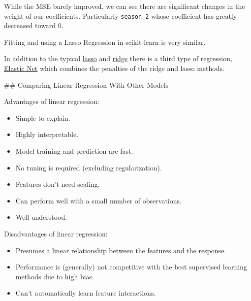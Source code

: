 \documentclass[11pt]{article}
\providecommand{\tightlist}{%
      \setlength{\itemsep}{0pt}\setlength{\parskip}{0pt}}
\begin{document}
    While the MSE barely improved, we can see there are significant changes
in the weight of our coefficients. Particularly \texttt{season\_2} whose
coefficient has greatly decreased toward 0.

Fitting and using a Lasso Regression in scikit-learn is very similar.

In addition to the typical
\href{http://scikit-learn.org/stable/modules/generated/sklearn.linear_model.Lasso.html}{lasso}
and
\href{http://scikit-learn.org/stable/modules/generated/sklearn.linear_model.Ridge.html}{ridge}
there is a third type of regression,
\href{http://scikit-learn.org/stable/modules/generated/sklearn.linear_model.ElasticNet.html}{Elastic
Net} which combines the penalties of the ridge and lasso methods.

     \#\# Comparing Linear Regression With Other Models

Advantages of linear regression:

\begin{itemize}
\tightlist
\item
  Simple to explain.
\item
  Highly interpretable.
\item
  Model training and prediction are fast.
\item
  No tuning is required (excluding regularization).
\item
  Features don't need scaling.
\item
  Can perform well with a small number of observations.
\item
  Well understood.
\end{itemize}

Disadvantages of linear regression:

\begin{itemize}
\tightlist
\item
  Presumes a linear relationship between the features and the response.
\item
  Performance is (generally) not competitive with the best supervised
  learning methods due to high bias.
\item
  Can't automatically learn feature interactions.
\end{itemize}


    
    
    
    
\end{document}
